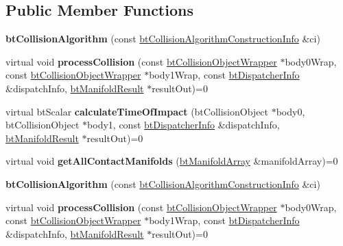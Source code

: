 \subsection*{Public Member Functions}
\begin{DoxyCompactItemize}
\item 
\mbox{\label{classbtCollisionAlgorithm_a59457c3cbe46ac8884a1c5fe554776b0}} 
{\bfseries bt\+Collision\+Algorithm} (const \hyperlink{structbtCollisionAlgorithmConstructionInfo}{bt\+Collision\+Algorithm\+Construction\+Info} \&ci)
\item 
\mbox{\label{classbtCollisionAlgorithm_a239122d128c81d97705204ee4defa613}} 
virtual void {\bfseries process\+Collision} (const \hyperlink{structbtCollisionObjectWrapper}{bt\+Collision\+Object\+Wrapper} $\ast$body0\+Wrap, const \hyperlink{structbtCollisionObjectWrapper}{bt\+Collision\+Object\+Wrapper} $\ast$body1\+Wrap, const \hyperlink{structbtDispatcherInfo}{bt\+Dispatcher\+Info} \&dispatch\+Info, \hyperlink{classbtManifoldResult}{bt\+Manifold\+Result} $\ast$result\+Out)=0
\item 
\mbox{\label{classbtCollisionAlgorithm_aea5afdcbb1266af69a44f05e9866edad}} 
virtual bt\+Scalar {\bfseries calculate\+Time\+Of\+Impact} (bt\+Collision\+Object $\ast$body0, bt\+Collision\+Object $\ast$body1, const \hyperlink{structbtDispatcherInfo}{bt\+Dispatcher\+Info} \&dispatch\+Info, \hyperlink{classbtManifoldResult}{bt\+Manifold\+Result} $\ast$result\+Out)=0
\item 
\mbox{\label{classbtCollisionAlgorithm_a224203965d0115e088db5f8aa8bd11a5}} 
virtual void {\bfseries get\+All\+Contact\+Manifolds} (\hyperlink{classbtAlignedObjectArray}{bt\+Manifold\+Array} \&manifold\+Array)=0
\item 
\mbox{\label{classbtCollisionAlgorithm_a59457c3cbe46ac8884a1c5fe554776b0}} 
{\bfseries bt\+Collision\+Algorithm} (const \hyperlink{structbtCollisionAlgorithmConstructionInfo}{bt\+Collision\+Algorithm\+Construction\+Info} \&ci)
\item 
\mbox{\label{classbtCollisionAlgorithm_a239122d128c81d97705204ee4defa613}} 
virtual void {\bfseries process\+Collision} (const \hyperlink{structbtCollisionObjectWrapper}{bt\+Collision\+Object\+Wrapper} $\ast$body0\+Wrap, const \hyperlink{structbtCollisionObjectWrapper}{bt\+Collision\+Object\+Wrapper} $\ast$body1\+Wrap, const \hyperlink{structbtDispatcherInfo}{bt\+Dispatcher\+Info} \&dispatch\+Info, \hyperlink{classbtManifoldResult}{bt\+Manifold\+Result} $\ast$result\+Out)=0

\end{DoxyCompactItemize}
